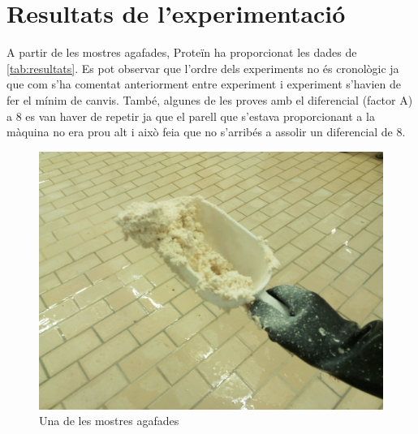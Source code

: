 \documentclass[a4paper]{article}
\begin{document}
\section{Resultats de l'experimentació}
A partir de les mostres agafades, Proteïn ha proporcionat les dades de \autoref{tab:resultats}. Es pot observar que l'ordre dels experiments no és cronològic ja que com s'ha comentat anteriorment entre experiment i experiment s'havien de fer el mínim de canvis. També, algunes de les proves amb el diferencial (factor A) a 8 es van haver de repetir ja que el parell que s'estava proporcionant a la màquina no era prou alt i això feia que no s'arribés a assolir un diferencial de 8.

\begin{figure}[H]
	\centering
	\includegraphics[width=.5\textwidth]{images/protein/mostra-compressed}
	\caption{Una de les mostres agafades}
	\label{fig:Mostra}
\end{figure} 	
\end{document}
